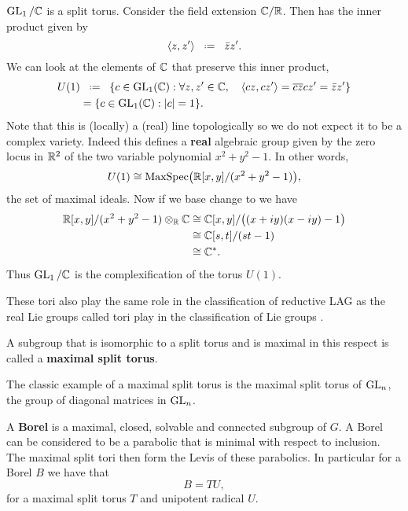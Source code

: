     \begin{example}
        \(\GL_1 /\C\) is a split torus. Consider the field extension \(\C/\R\). Then \C has the inner product given by 
        \[\inner{z, z'} \defeq \bar{z}z'.\]
        We can look at the elements of \(\C\) that preserve this inner product, 
        \begin{align*}
            U(1)&\defeq \{c\in \GL_1(\C) : \forall z,z'\in \C , \quad \inner{cz, cz'} = \overline{cz}cz' = \bar{z}z'\} \\
             &= \{c\in \GL_1(\C) : |c| = 1\}.
        \end{align*}
        Note that this is (locally) a (real) line topologically so we do not expect it to be a complex variety. Indeed this defines a \textbf{real} algebraic group given by the zero locus in \(\R^2\) of the two variable polynomial \(x^2 + y^2 - 1\). In other words,
        \[ U(1) \cong \mathrm{MaxSpec}\big(\R[x,y]/(x^2 + y^2 - 1)\big) ,\]
        the set of maximal ideals. Now if we base change to \C we have 
        \begin{align*}
            \R[x,y]/(x^2 + y^2 - 1) \tensor_\R \C &\cong \C[x,y]/\big((x+iy)(x-iy) -1 \big)\\
             &\cong \C[s,t]/(st -1) \\
             &\cong \C^\ast.
        \end{align*}
        Thus \(\GL_1 / \C\) is the complexification of the torus \(U(1)\).
    \end{example}
    
    \begin{remark}
        These tori also play the same role in the classification of reductive LAG as the real Lie groups called tori play in the classification of Lie groups \cite[Part III]{hallLieGroupsLie2015}.
    \end{remark}
    
    A subgroup that is isomorphic to a split torus and is maximal in this respect is called a \textbf{maximal split torus}. 
     \begin{example}
        The classic example of a maximal split torus is the maximal split torus of \(\operatorname{GL}_n\), the group of diagonal matrices in \(\operatorname{GL}_n\).
     \end{example}

    A \textbf{Borel} is a maximal, closed, solvable and connected subgroup of \(G\). A Borel can be considered to be a parabolic that is minimal with respect to inclusion. The maximal split tori then form the Levis of these parabolics. In particular for a Borel \(B\) we have that 
    \[B = TU,\]
    for a maximal split torus \(T\) and unipotent radical \(U\).

